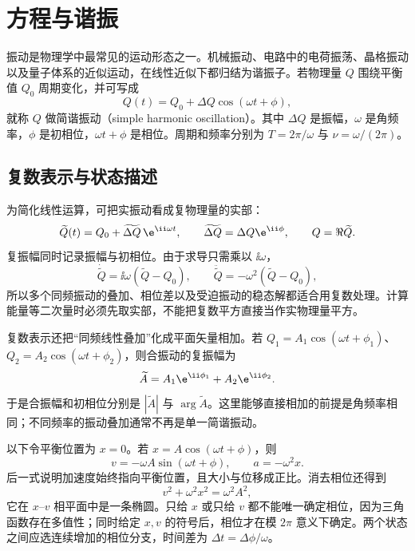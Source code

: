 \section{方程与谐振}
\label{r2ch04:sec:harmonic}

振动是物理学中最常见的运动形态之一。机械振动、电路中的电荷振荡、晶格振动以及量子体系的近似运动，在线性近似下都归结为谐振子。若物理量 $Q$ 围绕平衡值 $Q_0$ 周期变化，并可写成
\begin{equation}
 Q(t)=Q_0+\Delta Q\cos(\omega t+\phi),
 \label{r2ch04:eq:001}
\end{equation}
就称 $Q$ 做简谐振动（simple harmonic oscillation）。其中 $\Delta Q$ 是振幅，$\omega$ 是角频率，$\phi$ 是初相位，$\omega t+\phi$ 是相位。周期和频率分别为 $T=2\pi/\omega$ 与 $\nu=\omega/(2\pi)$。

\subsection{复数表示与状态描述}

为简化线性运算，可把实振动看成复物理量的实部：
\begin{equation}
 \widetilde Q(t)=Q_0+\widetilde{\Delta Q}\,\e^{\ii\omega t},
 \qquad \widetilde{\Delta Q}=\Delta Q\e^{\ii\phi},
 \qquad Q=\Re\widetilde Q .
 \label{r2ch04:eq:002}
\end{equation}
复振幅同时记录振幅与初相位。由于求导只需乘以 $\ii\omega$，
\begin{equation}
 \dot{\widetilde Q}=\ii\omega(\widetilde Q-Q_0),
 \qquad
 \ddot{\widetilde Q}=-\omega^2(\widetilde Q-Q_0),
 \label{r2ch04:eq:003}
\end{equation}
所以多个同频振动的叠加、相位差以及受迫振动的稳态解都适合用复数处理。计算能量等二次量时必须先取实部，不能把复数平方直接当作实物理量平方。

复数表示还把“同频线性叠加”化成平面矢量相加。若
$Q_1=A_1\cos(\omega t+\phi_1)$、$Q_2=A_2\cos(\omega t+\phi_2)$，则合振动的复振幅为
\[
 \widetilde A=A_1\e^{\ii\phi_1}+A_2\e^{\ii\phi_2}.
\]
于是合振幅和初相位分别是 $|\widetilde A|$ 与 $\arg\widetilde A$。这里能够直接相加的前提是角频率相同；不同频率的振动叠加通常不再是单一简谐振动。

以下令平衡位置为 $x=0$。若 $x=A\cos(\omega t+\phi)$，则
\begin{equation}
 v=-\omega A\sin(\omega t+\phi),\qquad
 a=-\omega^2x.
 \label{r2ch04:eq:004}
\end{equation}
后一式说明加速度始终指向平衡位置，且大小与位移成正比。消去相位还得到
\begin{equation}
 v^2+\omega^2x^2=\omega^2A^2,
 \label{r2ch04:eq:005}
\end{equation}
它在 $x$--$v$ 相平面中是一条椭圆。只给 $x$ 或只给 $v$ 都不能唯一确定相位，因为三角函数存在多值性；同时给定 $x,v$ 的符号后，相位才在模 $2\pi$ 意义下确定。两个状态之间应选连续增加的相位分支，时间差为 $\Delta t=\Delta\phi/\omega$。


